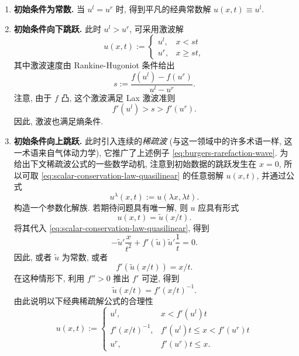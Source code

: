 \begin{enumerate}
\item \textbf{初始条件为常数.} 当 $u^l=u^r$ 时, 得到平凡的经典常数解 $u(x,t)\equiv u^l$.
\item \textbf{初始条件向下跳跃.} 此时 $u^l>u^r$, 可采用激波解
\begin{equation}\label{eq:scalar-riemann-shock-solution}
u(x,t):=\begin{cases}u^l,&x<st\\u^r,&x\geq st,\end{cases}
\end{equation}
其中激波速度由 Rankine-Hugoniot 条件给出
\begin{equation}\label{eq:scalar-riemann-shock-speed}
s:=\dfrac{f(u^l)-f(u^r)}{u^l-u^r}.
\end{equation}
注意, 由于 $f$ 凸, 这个激波满足 Lax 激波准则
\begin{equation}\label{eq:scalar-riemann-shock-lax-condition}
f'(u^l)>s>f'(u^r).
\end{equation}
因此, 激波也满足熵条件.\item \textbf{初始条件向上跳跃.} 此时引入连续的\emph{稀疏波} (与这一领域中的许多术语一样, 这一术语来自气体动力学), 它推广了上述例子 \eqref{eq:burgers-rarefaction-wave}. 为给出下文稀疏波公式的一些数学动机, 注意到初始数据的跳跃发生在 $x=0$, 所以可取 \eqref{eq:scalar-conservation-law-quasilinear} 的任意弱解 $u(x,t)$, 并通过公式
\begin{equation}\label{eq:scalar-riemann-scaled-solution}
u^\lambda(x,t):=u(\lambda x,\lambda t).
\end{equation}
构造一个参数化解族. 若期待问题具有唯一解, 则 $u$ 应具有形式
\begin{equation}\label{eq:scalar-riemann-self-similar-form}
u(x,t)=\tilde u(x/t).
\end{equation}
将其代入 \eqref{eq:scalar-conservation-law-quasilinear}, 得到
\begin{equation}\label{eq:scalar-rarefaction-similarity-equation}
-\tilde u'\dfrac{x}{t^2}+f'(\tilde u)\tilde u'\dfrac1t=0.
\end{equation}
因此, 或者 $\tilde u$ 为常数, 或者
\begin{equation}\label{eq:scalar-rarefaction-speed-value}
f'(\tilde u(x/t))=x/t.
\end{equation}
在这种情形下, 利用 $f''>0$ 推出 $f'$ 可逆, 得到
\begin{equation}\label{eq:scalar-rarefaction-source-inverse-notation}
\tilde u(x/t)=f'(x/t)^{-1}.
\end{equation}
由此说明以下经典稀疏解公式的合理性
\begin{equation}\label{eq:scalar-riemann-classical-rarefaction}
u(x,t):=\begin{cases}u^l,&x<f'(u^l)t\\f'(x/t)^{-1},&f'(u^l)t\leq x<f'(u^r)t\\u^r,&f'(u^r)t\leq x.\end{cases}
\end{equation}
\end{enumerate}
